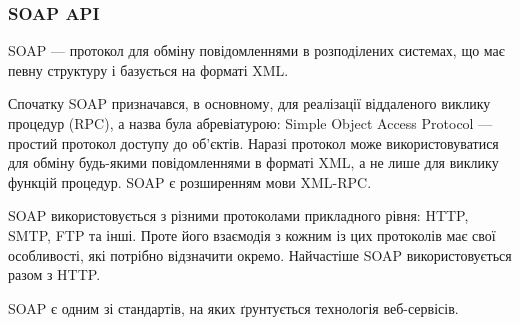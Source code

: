 \subsubsection{SOAP API}

SOAP — протокол для обміну повідомленнями в розподілених системах, що має певну структуру і базується на форматі XML.

Спочатку SOAP призначався, в основному, для реалізації віддаленого виклику процедур (RPC), а назва була абревіатурою: Simple Object Access Protocol — простий протокол доступу до об'єктів. Наразі протокол може використовуватися для обміну будь-якими повідомленнями в форматі XML, а не лише для виклику функцій процедур. SOAP є розширенням мови XML-RPC.

SOAP використовується з різними протоколами прикладного рівня: HTTP, SMTP, FTP та інші. Проте його взаємодія з кожним із цих протоколів має свої особливості, які потрібно відзначити окремо. Найчастіше SOAP використовується разом з HTTP.

SOAP є одним зі стандартів, на яких ґрунтується технологія веб-сервісів.
